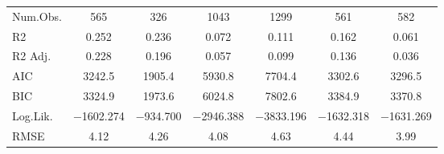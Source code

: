 \begin{table}
\begin{tabular}[t]{lcccccc}
\midrule
Num.Obs. & \num{565} & \num{326} & \num{1043} & \num{1299} & \num{561} & \num{582}\\
R2 & \num{0.252} & \num{0.236} & \num{0.072} & \num{0.111} & \num{0.162} & \num{0.061}\\
R2 Adj. & \num{0.228} & \num{0.196} & \num{0.057} & \num{0.099} & \num{0.136} & \num{0.036}\\
AIC & \num{3242.5} & \num{1905.4} & \num{5930.8} & \num{7704.4} & \num{3302.6} & \num{3296.5}\\
BIC & \num{3324.9} & \num{1973.6} & \num{6024.8} & \num{7802.6} & \num{3384.9} & \num{3370.8}\\
Log.Lik. & \num{-1602.274} & \num{-934.700} & \num{-2946.388} & \num{-3833.196} & \num{-1632.318} & \num{-1631.269}\\
RMSE & \num{4.12} & \num{4.26} & \num{4.08} & \num{4.63} & \num{4.44} & \num{3.99}\\
\bottomrule
\end{tabular}
\end{table}
